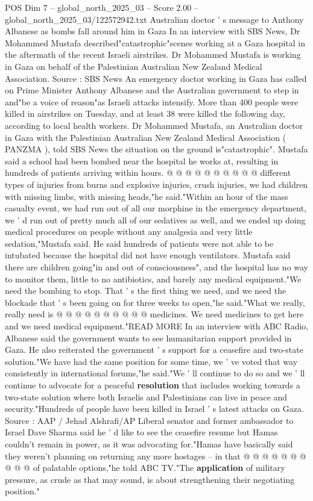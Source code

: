 \begin{textsample}{POS Dim 7 – global\_north\_2025\_03 – Score 2.00 – global\_north\_2025\_03/122572942.txt}  \label{ex:f7_pos_321}
Australian doctor ' s message to Anthony Albanese as bombs fall around him in Gaza In an interview with SBS News, Dr Mohammed Mustafa described"catastrophic"scenes working at a Gaza hospital in the aftermath of the recent Israeli airstrikes.
Dr Mohammed Mustafa is working in Gaza on behalf of the Palestinian Australian New Zealand Medical Association.
Source : SBS News An emergency doctor working in Gaza has called on Prime Minister Anthony Albanese and the Australian government to step in and"be a voice of reason"as Israeli attacks intensify.
More than 400 people were killed in airstrikes on Tuesday, and at least 38 were killed the following day, according to local health workers.
Dr Mohammed Mustafa, an Australian doctor in Gaza with the Palestinian Australian New Zealand Medical Association ( PANZMA ), told SBS News the situation on the ground is"catastrophic".
Mustafa said a school had been bombed near the hospital he works at, resulting in hundreds of patients arriving within hours. @ @ @ @ @ @ @ @ @ @ different types of injuries from burns and explosive injuries, crush injuries, we had children with missing limbs, with missing heads,"he said."Within an hour of the mass casualty event, we had run out of all our morphine in the emergency department, we ' d run out of pretty much all of our sedatives as well, and we ended up doing medical procedures on people without any analgesia and very little sedation,"Mustafa said.
He said hundreds of patients were not able to be intubated because the hospital did not have enough ventilators.
Mustafa said there are children going"in and out of consciousness", and the hospital has no way to monitor them, little to no antibiotics, and barely any medical equipment."We need the bombing to stop.
That ' s the first thing we need, and we need the blockade that ' s been going on for three weeks to open,"he said."What we really, really need is @ @ @ @ @ @ @ @ @ @ medicines.
We need medicines to get here and we need medical equipment."READ MORE In an interview with ABC Radio, Albanese said the government wants to see humanitarian support provided in Gaza.
He also reiterated the government ' s support for a ceasefire and two-state solution."We have had the same position for some time, we ' ve voted that way consistently in international forums,"he said."We ' ll continue to do so and we ' ll continue to advocate for a peaceful \textbf{resolution} that includes working towards a two-state solution where both Israelis and Palestinians can live in peace and security."Hundreds of people have been killed in Israel ' s latest attacks on Gaza.
Source : AAP / Jehad Alshrafi/AP Liberal senator and former ambassador to Israel Dave Sharma said he ' d like to see the ceasefire resume but Hamas couldn't remain in power, as it was advocating for."Hamas have basically said they weren't planning on returning any more hostages -- in that @ @ @ @ @ @ @ @ @ @ of palatable options,"he told ABC TV."The \textbf{application} of military pressure, as crude as that may sound, is about strengthening their negotiating position."

\end{textsample}
